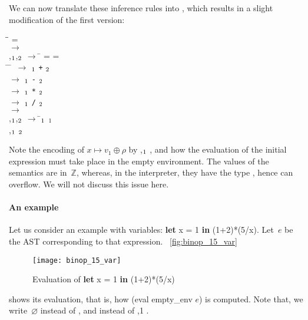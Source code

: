 We can now translate these inference rules into \OCaml, which results
in a slight modification of the first version:
\begin{tabbing}
\Xlet \= \Xrec \=    = \Xmatch
  \Xwith\\
 \>   \(\rightarrow\) \\
 \vbar \> 
 \lpar{},\(\sb{1}\),\(\sb{2}\)\rpar{}
 \(\rightarrow\) \= \Xlet {} = 
 \Xand  {} = \\
 \> \> \Xin \= \lpar\Xmatch {} \Xwith \= \;\,  \(\rightarrow\)
 \(\sb{1}\) \texttt{+} \(\sb{2}\)\\
 \> \> \> \> \vbar  {} \(\rightarrow\)
 \(\sb{1}\) \texttt{-} \(\sb{2}\)\\
 \> \> \> \> \vbar {} \(\rightarrow\) 
 \(\sb{1}\) \texttt{*} \(\sb{2}\)\\
 \> \> \> \> \vbar {} \(\rightarrow\)
 \(\sb{1}\) \texttt{/} \(\sb{2}\)\rpar\\

\vbar \>   \(\rightarrow\)  \\
\vbar \>  \lpar{},\(\sb{1}\),\(\sb{2}\)\rpar{}
\(\rightarrow\) \= \Xlet {}\(\sb{1}\) \equal {}
 \(\sb{1}\)\\
\>\>\Xin  {} \lpar{}
\lpar{},\(\sb{1}\)\rpar{} \rpar{}
\(\sb{2}\)
\end{tabbing}
Note the encoding of $x \mapsto v_1 \oplus \rho$ by 
\lpar{},\(\sb{1}\)\rpar{} , and how the
evaluation of the initial expression must take place in the empty
environment. The values of the semantics are in~$\mathbb{Z}$, whereas,
in the interpreter, they have the type , hence can
overflow. We will not discuss this issue here.

\paragraph{An example}

Let us consider an example with variables: \textsf{\textbf{let} x = 1
  \textbf{in} (1+2)*(5/x)}. Let~$e$ be the AST corresponding to that
expression. \Fig~\vref{fig:binop_15_var}
\begin{figure}[b]
\centering
\texttt{[image: binop\_15\_var]}
\caption{Evaluation of \textsf{\textbf{let} x = 1 \textbf{in} (1+2)*(5/x)}
\label{fig:binop_15_var}}
\end{figure}
shows its evaluation, that is, how \textsf{(eval empty\_env $e$)} is
computed. Note that, we write~$\varnothing$ instead of
, and  instead of \lpar{}
\lpar{},\num{1}\rpar{} \rpar.

